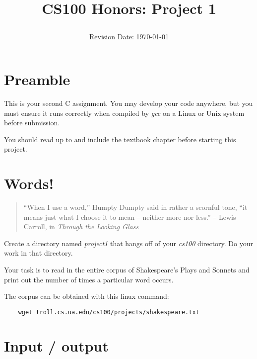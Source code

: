 \documentclass[12pt]{article}
\title{CS100 Honors: Project 1\\
\date{Revision Date: \today}}
\begin{document}
\maketitle

\thispagestyle{empty}

\W\subsubsection*{}
\W\htmlrule

\section*{Preamble}

This is your second C assignment.  You may develop your code anywhere,
but you must ensure it runs correctly when compiled by {\it gcc}
on a Linux or Unix system
before submission.

You should read up to and include the textbook chapter
before starting this project.


\section*{Words!} 

\begin{quote}
``When I use a word,'' Humpty Dumpty said in rather a scornful tone,
``it means just what I choose it to mean -- neither more nor less.''
-- 
Lewis Carroll, in
{\it Through the Looking Glass}
\end{quote}

Create a directory named {\it project1} that hangs off of your 
{\it cs100} directory. Do your work in that directory.

Your task is to read in the entire corpus of Shakespeare's Plays and Sonnets
and print out the number of times a particular word occurs.

The corpus can be obtained with this linux command: 

\begin{verbatim}
    wget troll.cs.ua.edu/cs100/projects/shakespeare.txt
\end{verbatim}

\section*{Input / output}
\end{document}
